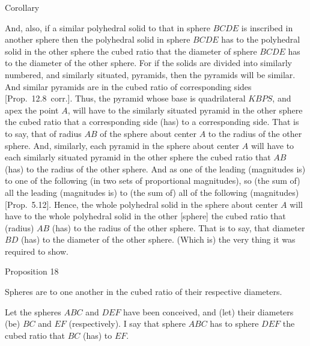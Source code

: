 \begin{center}
{\large Corollary}
\end{center}

And, also, if a similar polyhedral solid  to that in sphere $BCDE$ is inscribed in another sphere then the polyhedral solid in sphere $BCDE$ has
to the polyhedral solid in the other sphere the cubed ratio that the diameter of sphere $BCDE$ has to the diameter of the other
sphere. For if the solids are divided into similarly numbered, and similarly situated, pyramids, then the pyramids will be
similar. And similar pyramids are in the cubed ratio of corresponding sides [Prop.~12.8~corr.]. 
Thus, the pyramid whose base is quadrilateral $KBPS$, and apex the point $A$, will have to the similarly situated pyramid in the other
sphere the cubed ratio that a corresponding side (has) to a corresponding side. That is to say, that of radius $AB$ of the
sphere about center $A$ to the radius of the other sphere. And, similarly, each pyramid in the sphere about center $A$ will have to
each similarly situated pyramid in the other sphere the cubed ratio that $AB$ (has) to the radius of the other sphere. And as
one of the leading (magnitudes is) to one of the following (in two sets of proportional magnitudes), so (the sum of) all the
leading (magnitudes is) to (the sum of) all of the following (magnitudes)  [Prop.~5.12]. 
Hence, the whole polyhedral solid in the sphere about center $A$ will have to the whole polyhedral solid in the other [sphere] the
cubed ratio that (radius) $AB$ (has) to the radius of the other sphere. That is to say, that diameter $BD$ (has) to the diameter of the
other sphere. (Which is) the very thing it was required to show.


\begin{center}
{\large Proposition 18}
\end{center}

Spheres  are to one another in the cubed ratio of their respective diameters.

\epsfysize=2.7in
\centerline{}

Let the spheres $ABC$ and $DEF$ have been conceived, and (let) their diameters (be) $BC$ and $EF$ (respectively). 
I say that sphere $ABC$ has to sphere $DEF$ the cubed ratio that $BC$ (has) to $EF$.

